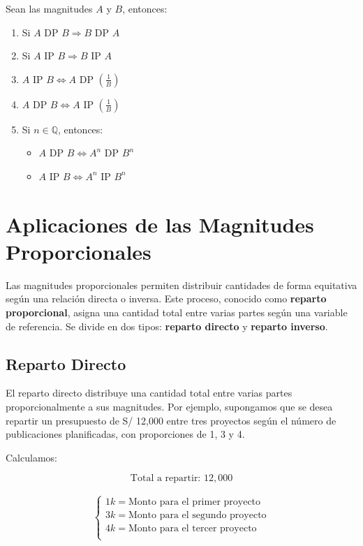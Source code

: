 \documentclass[
  stu,
  floatsintext,
  longtable,
  a4paper,
  nolmodern,
  notxfonts,
  notimes,
  colorlinks=true,linkcolor=blue,citecolor=blue,urlcolor=blue]{apa7}
\providecommand{\tightlist}{%
  \setlength{\itemsep}{0pt}\setlength{\parskip}{0pt}}
\begin{document}
Sean las magnitudes \(A\) y \(B\), entonces:

\begin{enumerate}
\def\labelenumi{\arabic{enumi}.}
\tightlist
\item
  Si \(A \text{ DP } B \Rightarrow B \text{ DP } A\)
\item
  Si \(A \text{ IP } B \Rightarrow B \text{ IP } A\)
\item
  \(A \text{ IP } B \Leftrightarrow A \text{ DP } \left( \frac{1}{B} \right)\)
\item
  \(A \text{ DP } B \Leftrightarrow A \text{ IP } \left( \frac{1}{B} \right)\)
\item
  Si \(n \in \mathbb{Q}\), entonces:

  \begin{itemize}
  \tightlist
  \item
    \(A \text{ DP } B \Leftrightarrow A^n \text{ DP } B^n\)
  \item
    \(A \text{ IP } B \Leftrightarrow A^n \text{ IP } B^n\)
  \end{itemize}
\end{enumerate}

\section{Aplicaciones de las Magnitudes
Proporcionales}\label{aplicaciones-de-las-magnitudes-proporcionales}

Las magnitudes proporcionales permiten distribuir cantidades de forma
equitativa según una relación directa o inversa. Este proceso, conocido
como \textbf{reparto proporcional}, asigna una cantidad total entre
varias partes según una variable de referencia. Se divide en dos tipos:
\textbf{reparto directo} y \textbf{reparto inverso}.

\subsection{Reparto Directo}\label{reparto-directo}

El reparto directo distribuye una cantidad total entre varias partes
proporcionalmente a sus magnitudes. Por ejemplo, supongamos que se desea
repartir un presupuesto de S/ 12,000 entre tres proyectos según el
número de publicaciones planificadas, con proporciones de 1, 3 y 4.

Calculamos:

\[
\text{Total a repartir: } 12,000
\]

\begin{align*}
\begin{cases}
1k = \text{Monto para el primer proyecto} \\
3k = \text{Monto para el segundo proyecto} \\
4k = \text{Monto para el tercer proyecto} \\
\end{cases}
\end{align*}
\end{document}
